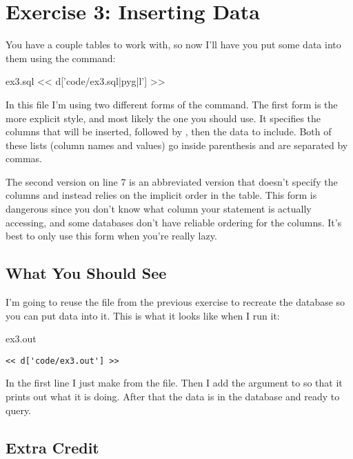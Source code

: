 \chapter{Exercise 3: Inserting Data}

You have a couple tables to work with, so now I'll have you put some data into them
using the  command:

\begin{code}{ex3.sql}
<< d['code/ex3.sql|pyg|l'] >>
\end{code}

In this file I'm using two different forms of the  command.
The first form is the more explicit style, and most likely the one you should
use.  It specifies the columns that will be inserted, followed by ,
then the data to include.  Both of these lists (column names and values)
go inside parenthesis and are separated by commas.

The second version on line 7 is an abbreviated version that doesn't specify
the columns and instead relies on the implicit order in the table.  This form
is dangerous since you don't know what column your statement is actually 
accessing, and some databases don't have reliable ordering for the columns.
It's best to only use this form when you're really lazy.

\section{What You Should See}

I'm going to reuse the  file from the previous exercise to
recreate the database so you can put data into it.  This is what it looks
like when I run it:

\begin{code}{ex3.out}
\begin{Verbatim}
<< d['code/ex3.out'] >>
\end{Verbatim}
\end{code}

In the first line I just make  from the  file.
Then I add the  argument to  so that it
prints out what it is doing.  After that the data is in the database
and ready to query.

\section{Extra Credit}

